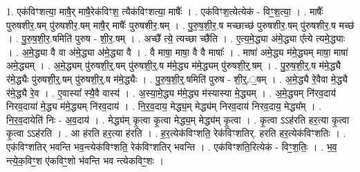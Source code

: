 \documentclass[17pt]{extarticle}
\begin{document}
1. एक॑विꣳशत्या॒ माषै॒र् माषै॒रेक॑विꣳश॒ त्यैक॑विꣳशत्या॒ माषैः᳚ । . एक॑विꣳश॒त्येत्येक॑ - विꣳ॒॒श॒त्या॒ । . माषैः᳚ पुरुषशीर॒.षम् पु॑रुषशीर॒.षम् माषै॒र् माषैः᳚ पुरुषशीर॒.षम् । . पु॒रु॒ष॒शी॒र॒.ष मच्छाच्छ॑ पुरुषशीर॒.षम् पु॑रुषशीर॒.ष मच्छ॑ । . पु॒रु॒ष॒शी॒र॒.षमिति॑ पुरुष - शी॒र॒.षम् । . अच्छै᳚ त्ये॒ त्यच्छा च्छै॑ति । . ए॒त्य॒मे॒द्ध्या अ॑मे॒द्ध्या ए᳚त्ये त्यमे॒द्ध्याः । . अ॒मे॒द्ध्या वै वा अ॑मे॒द्ध्या अ॑मे॒द्ध्या वै । . वै माषा॒ माषा॒ वै वै माषाः᳚ । . माषा॑ अमे॒द्ध्य म॑मे॒द्ध्यम् माषा॒ माषा॑ अमे॒द्ध्यम् । . अ॒मे॒द्ध्यम् पु॑रुषशी॒र्॒.षम् पु॑रुषशी॒र्॒.ष म॑मे॒द्ध्य म॑मे॒द्ध्यम् पु॑रुषशी॒र्॒.षम् । . पु॒रु॒ष॒शी॒र्॒.ष म॑मे॒द्ध्यै र॑मे॒द्ध्यैः पु॑रुषशी॒र्॒.षम् पु॑रुषशी॒र्॒.ष म॑मे॒द्ध्यैः । . पु॒रु॒ष॒शी॒र्॒.षमिति॑ पुरुष - शी॒र्॒.॒षम् । . अ॒मे॒द्ध्यै रे॒वैवा मे॒द्ध्यै र॑मे॒द्ध्यै रे॒व । . ए॒वास्या᳚ स्यै॒वै वास्य॑ । . अ॒स्या॒मे॒द्ध्य म॑मे॒द्ध्य म॑स्यास्या मे॒द्ध्यम् । . अ॒मे॒द्ध्यम् नि॑रव॒दाय॑ निरव॒दाया॑ मे॒द्ध्य म॑मे॒द्ध्यम् नि॑रव॒दाय॑ । . नि॒र॒व॒दाय॒ मेद्ध्य॒म् मेद्ध्य॑म् निरव॒दाय॑ निरव॒दाय॒ मेद्ध्य᳚म् । . नि॒र॒व॒दायेति॑ निः - अ॒व॒दाय॑ । . मेद्ध्य॑म् कृ॒त्वा कृ॒त्वा मेद्ध्य॒म् मेद्ध्य॑म् कृ॒त्वा । . कृ॒त्वा ऽऽह॑रति हर॒त्या कृ॒त्वा कृ॒त्वा ऽऽह॑रति । . आ ह॑रति हर॒त्या ह॑रति । . ह॒र॒त्येक॑विꣳशति॒ रेक॑विꣳशतिर्. हरति हर॒त्येक॑विꣳशतिः । . एक॑विꣳशतिर् भवन्ति भव॒न्त्येक॑विꣳशति॒ रेक॑विꣳशतिर् भवन्ति । . एक॑विꣳशति॒रित्येक॑ - विꣳ॒॒श॒तिः॒ । . भ॒व॒ न्त्ये॒क॒विꣳ॒॒श ए॑कविꣳ॒॒शो भ॑वन्ति भव न्त्येकविꣳ॒॒शः । \newline
\end{document}

